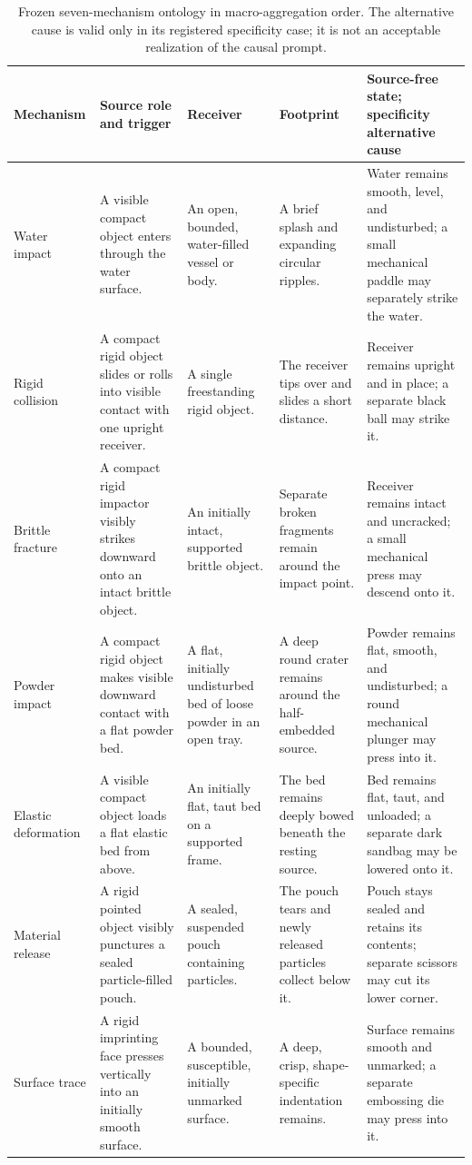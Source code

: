 \begin{table}[t]
  \centering
  \caption{Frozen seven-mechanism ontology in macro-aggregation order.  The
  alternative cause is valid only in its registered specificity case; it is
  not an acceptable realization of the causal prompt.}
  \label{tab:seven-mechanism-ontology}
  \footnotesize
  \setlength{\tabcolsep}{3.5pt}
  \begin{tabularx}{\textwidth}{@{}l>{\raggedright\arraybackslash}X>{\raggedright\arraybackslash}X>{\raggedright\arraybackslash}X>{\raggedright\arraybackslash}X@{}}
    \toprule
    Mechanism & Source role and trigger & Receiver & Footprint & Source-free state; specificity alternative cause \\
    \midrule
    Water impact & A visible compact object enters through the water surface. & An open, bounded, water-filled vessel or body. & A brief splash and expanding circular ripples. & Water remains smooth, level, and undisturbed; a small mechanical paddle may separately strike the water. \\
    Rigid collision & A compact rigid object slides or rolls into visible contact with one upright receiver. & A single freestanding rigid object. & The receiver tips over and slides a short distance. & Receiver remains upright and in place; a separate black ball may strike it. \\
    Brittle fracture & A compact rigid impactor visibly strikes downward onto an intact brittle object. & An initially intact, supported brittle object. & Separate broken fragments remain around the impact point. & Receiver remains intact and uncracked; a small mechanical press may descend onto it. \\
    Powder impact & A compact rigid object makes visible downward contact with a flat powder bed. & A flat, initially undisturbed bed of loose powder in an open tray. & A deep round crater remains around the half-embedded source. & Powder remains flat, smooth, and undisturbed; a round mechanical plunger may press into it. \\
    Elastic deformation & A visible compact object loads a flat elastic bed from above. & An initially flat, taut bed on a supported frame. & The bed remains deeply bowed beneath the resting source. & Bed remains flat, taut, and unloaded; a separate dark sandbag may be lowered onto it. \\
    Material release & A rigid pointed object visibly punctures a sealed particle-filled pouch. & A sealed, suspended pouch containing particles. & The pouch tears and newly released particles collect below it. & Pouch stays sealed and retains its contents; separate scissors may cut its lower corner. \\
    Surface trace & A rigid imprinting face presses vertically into an initially smooth surface. & A bounded, susceptible, initially unmarked surface. & A deep, crisp, shape-specific indentation remains. & Surface remains smooth and unmarked; a separate embossing die may press into it. \\
    \bottomrule
  \end{tabularx}
\end{table}


